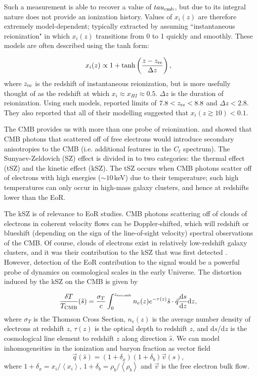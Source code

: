 Such a measurement is able to recover a value of $tau_{\rm cmb}$, but due to its integral nature does not provide an ionization history. Values of $x_i(z)$ are therefore extremely model-dependent; typically extracted by assuming ``instantaneous reionization" in which $x_i(z)$ transitions from 0 to 1 quickly and smoothly. These models are often described using the tanh form:

\begin{equation}
x_i(z) \propto 1+\tanh\left(\frac{z - z_{\rm re}}{\Delta z}\right),
\end{equation}
where $z_{\rm re}$ is the redshift of instantaneous reionization, but is more usefully thought of as the redshift at which $x_i \approx x_{HI} \approx 0.5$. $\Delta z$ is the duration of reionization. Using such models, \cite{Planck.16.reionization} reported limits of  $7.8 < z_{\rm re} < 8.8$ and $\Delta z < 2.8$. They also reported that all of their modelling suggested that $x_i(z\gtrsim10)<0.1$.

The CMB provides us with more than one probe of reionization. \cite{Zeldovich.69} and \cite{Sunyaev.70} showed that CMB photons that scattered off of free electrons would introduce secondary anisotropies to the CMB (i.e. additional features in the $C_{\ell}$ spectrum). The Sunyaev-Zeldovich (SZ) effect is divided in to two categories: the thermal effect (tSZ) and the kinetic effect (kSZ). The tSZ occurs when CMB photons scatter off of electrons with high energies ($\sim 10$\,keV) due to their temperature; such high temperatures can only occur in high-mass galaxy clusters, and hence at redshifts lower than the EoR. 

The kSZ is of relevance to EoR studies. CMB photons scattering off of clouds of electrons in coherent velocity flows can be Doppler-shifted, which will redshift or blueshift (depending on the sign of the line-of-sight velocity) spectral observations of the CMB. Of course, clouds of electrons exist in relatively low-redshift galaxy clusters, and it was their contribution to the kSZ that was first detected \citep{Hand.12}. However, detection of the EoR contribution to the signal would be a powerful probe of dynamics on cosmological scales in the early Universe. The distortion induced by the kSZ on the CMB is given by

\begin{equation}
\frac{\delta T}{T_{\rm CMB}}(\hat{s}) = \frac{\sigma_T}{c} \int_0^{z_{\rm recomb}} n_e(z)e^{-\tau(z)} \hat{s}\cdot\vec{q} \frac{{\rm d}s}{{\rm d}z}{\rm d}z,
\label{eq:eor_intro_ksz}
\end{equation}
where $\sigma_T$ is the Thomson Cross Section, $n_e(z)$ is the average number density of electrons at redshift $z$, $\tau(z)$ is the optical depth to redshift $z$, and d$s$/d$z$ is the cosmological line element to redshift $z$ along direction $\hat{s}$. We can model inhomogeneities in the ionization and baryon fraction as vector field
\begin{equation}
\vec{q}(\hat{s}) = (1+\delta_x)(1+\delta_b)\vec{v}(\hat{s}),
\end{equation}
where $1+\delta_x = x_i/\left\langle x_i \right\rangle$, $1+\delta_b= \rho_b/\left\langle \rho_b \right\rangle$ and $\vec{v}$ is the free electron bulk flow.

